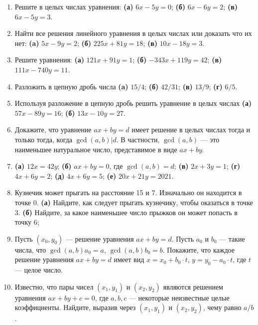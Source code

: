 \begin{enumerate}
\item Решите в целых числах уравнения: \textbf{(а)} $6x-5y = 0$;
\textbf{(б)} $6x-6y = 2$; \textbf{(в)} $6x - 5y = 3$.

\item Найти все решения линейного уравнения в целых числах или доказать что их нет:
\textbf{(a)} $5x-9y=2$; \textbf{(б)} $225x+81y=18$; \textbf{(в)} $10x-18y=3$.

\item Решите уравнения: \textbf{(а)} $121x + 91y = 1$; \textbf{(б)} $-343x + 119y = 42$;
\textbf{(в)} $111x - 740y = 11$.

\item Разложить в цепную дробь числа \textbf{(a)} $15/4$; \textbf{(б)} $42/31$; \textbf{(в)} $13/9$;
\textbf{(г)} $6/5$.

\item Используя разложение в цепную дробь решить уравнение в целых числах
\textbf{(а)} $57x - 89y = 16$; \textbf{(б)} $13x - 10y = 27$.

\item Докажите, что уравнение $ax + by = d$ имеет решение в целых
числах тогда и только тогда, когда $\gcd(a, b)|d$. В частности,
$\gcd(a, b)$ --- это наименьшее натуральное число, представимое в
виде $ax + by$.

\item  \textbf{(а)} $12x = 42y$; \textbf{(б)} $ax + by = 0$, где $\gcd(a, b) = d$;
\textbf{(в)} $2x + 3y = 1$; \textbf{(г)} $4x + 6y = 2$; \textbf{(д)} $4x + 6y = 5$; \textbf{(е)} $20x + 21y = 2021$.

\item Кузнечик может прыгать на расстояние 15 и 7. Изначально он
находится в точке 0. \textbf{(а)} Найдите, как следует прыгать кузнечику,
чтобы оказаться в точке 3. \textbf{(б)} Найдите, за какое наименьшее число
прыжков он может попасть в точку 6;

\item Пусть $(x_0, y_0)$ --- решение уравнения $ax + by = d$. Пусть $a_0$ и $b_0$
--- такие числа, что $\gcd(a, b)a_0 = a$, $\gcd(a, b)b_0 = b$. Покажите,
что каждое решение уравнения $ax + by = d$ имеет вид $x = x_0 + b_0 \cdot t$,
$y = y_0 - a_0 \cdot t$, где $t$ --- целое число.

\item Известно, что пары чисел $(x_1 , y_1)$ и $(x_2 , y_2)$ являются решением
 уравнения $ax + by + c = 0$, где $a, b, c$ --- некоторые неизвестные
целые коэффициенты. Найдите, выразив через $(x_1, y_1)$ и $(x_2, y_2)$,
чему равно $a/b$.


\end{enumerate}
